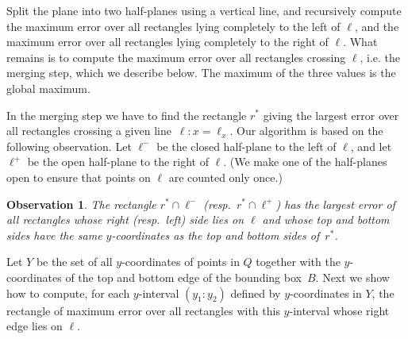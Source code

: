 \documentclass{elsart}
\newtheorem{theorem}[definition]{Theorem}
\newtheorem{observation}[definition]{Observation}
\begin{document}

Split the plane into two half-planes
using a vertical line, and recursively compute the maximum error over
all rectangles lying completely to the left of $\ell$, and the maximum
error over all rectangles lying completely to the right of $\ell$.
What remains is to compute the maximum error over all rectangles
crossing $\ell$, i.e. the merging step, which we describe below. The
maximum of the three values is the global maximum.

In the merging step we have to find the rectangle $r^*$ giving the
largest error over all rectangles crossing a given line~$\ell:
x=\ell_x$. Our algorithm is based on the following observation. Let
$\ell^-$ be the closed half-plane to the left of $\ell$, and let
$\ell^+$ be the open half-plane to the right of $\ell$. (We make one
of the half-planes open to ensure that points on $\ell$ are counted
only once.)
\begin{observation}
The rectangle $r^* \cap \ell^-$ (resp.~$r^* \cap \ell^+$)
has the largest error of all rectangles whose right (resp.~left) side
lies on $\ell$ and whose top and
bottom sides have the same $y$-coordinates as the top and
bottom sides of~$r^*$.
\end{observation}
Let $Y$ be the set of all $y$-coordinates of points in $Q$ together
with the $y$-coordinates of the top and bottom edge of the bounding
box~$B$. Next we show how to compute, for each $y$-interval $(y_1:y_2)$
defined by $y$-coordinates in $Y$, the rectangle of maximum error over
all rectangles with this $y$-interval whose right edge lies on $\ell$.
\end{document}
